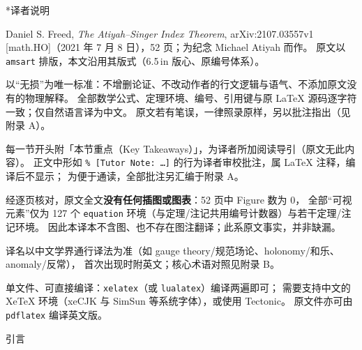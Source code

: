 \documentclass[11pt]{amsart}
\makeatletter
\def\section{\@startsection{section}{1}%
  \z@{4\linespacing\@plus\linespacing}{\linespacing}%
  {\bfseries\centering}}
\theoremstyle{definition}
\theoremstyle{remark}
\theoremstyle{plain}
\numberwithin{equation}{section}
\renewcommand{\:}{\colon}
\makeatother
\begin{document}
\section*{译者说明}

\begin{description}[leftmargin=4.2em,style=nextline,itemsep=3pt,topsep=2pt]
  \item[原文] Daniel S. Freed, \emph{The Atiyah--Singer Index Theorem},
    arXiv:2107.03557v1 [math.HO]（2021 年 7 月 8 日），52 页；为纪念 Michael Atiyah 而作。
    原文以 \texttt{amsart} 排版，本文沿用其版式（6.5\,in 版心、原编号体系）。
  \item[翻译原则] 以“无损”为唯一标准：不增删论证、不改动作者的行文逻辑与语气、不添加原文没有的物理解释。
    全部数学公式、定理环境、编号、引用键与原 LaTeX 源码逐字符一致；仅自然语言译为中文。
    原文若有笔误，一律照录原样，另以批注指出（见附录 A）。
  \item[结构] 每一节开头附「本节重点（Key Takeaways）」，为译者所加阅读导引（原文无此内容）。
    正文中形如 \texttt{\% [Tutor Note: \dots]} 的行为译者审校批注，属 LaTeX 注释，编译后不显示；
    为便于通读，全部批注另汇编于附录 A。
  \item[关于图表] 经逐页核对，原文全文\textbf{没有任何插图或图表}：52 页中 Figure 数为 $0$，
    全部“可视元素”仅为 127 个 \texttt{equation} 环境（与定理/注记共用编号计数器）与若干定理/注记环境。
    因此本译本不含图、也不存在图注翻译；此系原文事实，并非缺漏。
  \item[术语] 译名以中文学界通行译法为准（如 gauge theory/规范场论、holonomy/和乐、anomaly/反常），
    首次出现时附英文；核心术语对照见附录 B。
  \item[编译] 单文件、可直接编译：\texttt{xelatex}（或 \texttt{lualatex}）编译两遍即可；
    需要支持中文的 XeTeX 环境（xeCJK 与 SimSun 等系统字体），或使用 Tectonic。
    原文件亦可由 \texttt{pdflatex} 编译英文版。
\end{description}



\section{引言}\label{sec:1}
\end{document}
